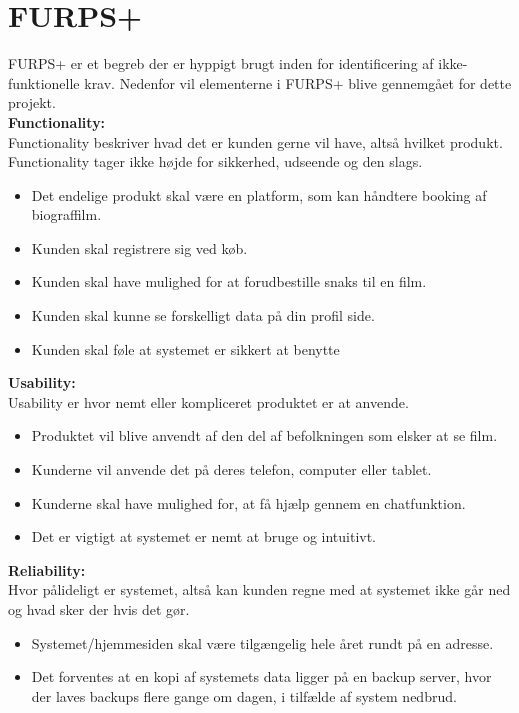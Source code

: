 \section{FURPS+}\label{sec:furps}
FURPS+ er et begreb der er hyppigt brugt inden for identificering af ikke-funktionelle krav. Nedenfor vil elementerne i FURPS+ 
blive gennemgået for dette projekt. \\

\textbf{Functionality:} \\
Functionality beskriver hvad det er kunden gerne vil have, altså hvilket produkt. Functionality tager ikke højde for sikkerhed, udseende og den slags.
\begin{itemize}
    \item Det endelige produkt skal være en platform, som kan håndtere booking af biograffilm.
    \item Kunden skal registrere sig ved køb.
    \item Kunden skal have mulighed for at forudbestille snaks til en film.
    \item Kunden skal kunne se forskelligt data på din profil side.
    \item Kunden skal føle at systemet er sikkert at benytte \\
\end{itemize}

\textbf{Usability:} \\
Usability er hvor nemt eller kompliceret produktet er at anvende. 
\begin{itemize}
    \item Produktet vil blive anvendt af den del af befolkningen som elsker at se film.
    \item Kunderne vil anvende det på deres telefon, computer eller tablet.
    \item Kunderne skal have mulighed for, at få hjælp gennem en chatfunktion.
    \item Det er vigtigt at systemet er nemt at bruge og intuitivt.
\end{itemize} 

\textbf{Reliability:} \\
Hvor pålideligt er systemet, altså kan kunden regne med at systemet ikke går ned og hvad sker der hvis det gør.

\begin{itemize}
    \item Systemet/hjemmesiden skal være tilgængelig hele året rundt på en adresse.
    \item Det forventes at en kopi af systemets data ligger på en backup server, hvor der laves backups flere gange om dagen, 
    i tilfælde af system nedbrud.
\end{itemize}

